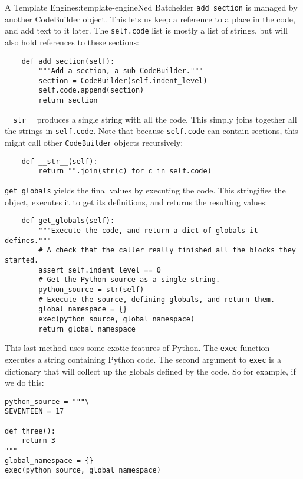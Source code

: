 \begin{aosachapter}{A Template Engine}{s:template-engine}{Ned Batchelder}
\texttt{add\_section} is managed by another CodeBuilder object. This
lets us keep a reference to a place in the code, and add text to it
later. The \texttt{self.code} list is mostly a list of strings, but will
also hold references to these sections:

\begin{verbatim}
    def add_section(self):
        """Add a section, a sub-CodeBuilder."""
        section = CodeBuilder(self.indent_level)
        self.code.append(section)
        return section
\end{verbatim}

\texttt{\_\_str\_\_} produces a single string with all the code. This
simply joins together all the strings in \texttt{self.code}. Note that
because \texttt{self.code} can contain sections, this might call other
\texttt{CodeBuilder} objects recursively:

\begin{verbatim}
    def __str__(self):
        return "".join(str(c) for c in self.code)
\end{verbatim}

\texttt{get\_globals} yields the final values by executing the code.
This stringifies the object, executes it to get its definitions, and
returns the resulting values:

\begin{verbatim}
    def get_globals(self):
        """Execute the code, and return a dict of globals it defines."""
        # A check that the caller really finished all the blocks they started.
        assert self.indent_level == 0
        # Get the Python source as a single string.
        python_source = str(self)
        # Execute the source, defining globals, and return them.
        global_namespace = {}
        exec(python_source, global_namespace)
        return global_namespace
\end{verbatim}

This last method uses some exotic features of Python. The \texttt{exec}
function executes a string containing Python code. The second argument
to \texttt{exec} is a dictionary that will collect up the globals
defined by the code. So for example, if we do this:

\begin{verbatim}
python_source = """\
SEVENTEEN = 17

def three():
    return 3
"""
global_namespace = {}
exec(python_source, global_namespace)
\end{verbatim}


\end{aosachapter}
